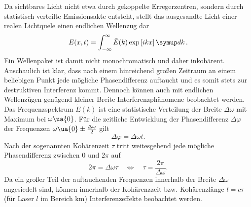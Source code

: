 Da sichtbares Licht nicht etwa durch gekoppelte Erregerzentren, sondern durch statistisch verteilte Emissionsakte entsteht,
stellt das ausgesandte Licht einer realen Lichtquele einen endlichen Wellenzug dar
\begin{equation}
  E(x, t) = \int_{-\infty}^{\infty}\tilde{E}(k)\exp\left[ikx \right]\dif{k}.
\end{equation}
Ein Wellenpaket ist damit nicht monochromatisch und daher inkohärent. Anschaulich ist klar, dass nach einem hinreichend großen Zeitraum
an einem beliebigen Punkt jede mögliche Phasendifferenz auftaucht und es somit stets zur destruktiven Interferenz kommt. Dennoch
können auch mit endlichen Wellenzügen genügend kleiner Breite Interferenzphänomene beobachtet werden. Das Frequenzspektrum $\tilde{E}(k)$
ist eine statistische Verteilung der Breite $\Delta \omega$ mit Maximum bei $\omega\ua{0}$.
Für die zeitliche Entwicklung der Phasendifferenz $\Delta \varphi$ der Frequenzen $\omega\ua{0} \pm \frac{\Delta \omega }{2}$ gilt
\begin{equation}
  \Delta \varphi = \Delta \omega t.
\end{equation}
Nach der sogenannten Kohärenzeit $\tau$ tritt weitesgehend jede mögliche Phasendifferenz zwischen $0$ und $2\pi$ auf
\begin{equation}
  2\pi = \Delta \omega \tau \quad \Leftrightarrow \quad \tau = \frac{2\pi}{\Delta \omega}.
\end{equation}
Da ein großer Teil der auftauchenden Frequenzen innerhalb der Breite $\Delta \omega$ angesiedelt sind, können innerhalb der Kohärenzzeit
bzw. Kohärenzlänge $l = c \tau$ (für Laser $l$ im Bereich $\si{\kilo\meter}$) Interferenzeffekte beobachtet werden.

